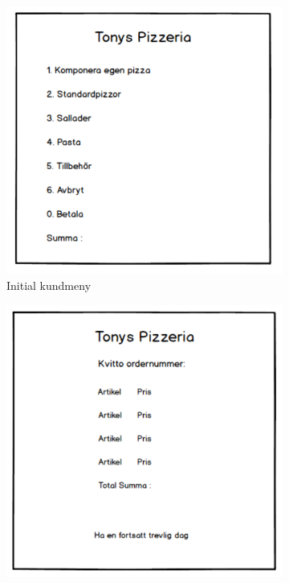 \documentclass{article}
\theoremstyle{remark}                                         %
\begin{document}
\begin{figure}
    \centering
    \begin{subfigure}[b]{0.3\textwidth}
        \includegraphics[width=\textwidth]{img/Skissbilder/Screen1.PNG}
        \caption{Initial kundmeny}
    \end{subfigure}
        \begin{subfigure}[b]{0.3\textwidth}
        \includegraphics[width=\textwidth]{img/Skissbilder/Screen2.PNG}

\end{subfigure}
\end{figure}
\end{document}
